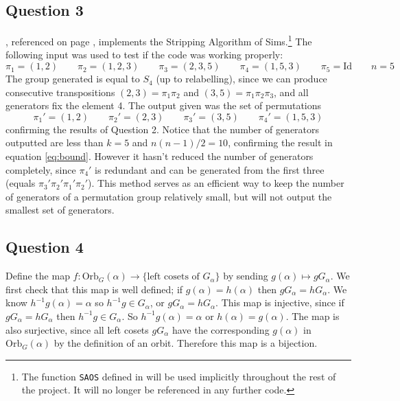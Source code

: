 \documentclass[10pt,a4paper,notitlepage]{article}
\newcommand{\Orb}{\text{Orb}}
\newcommand{\Id}{\text{Id}}
\begin{document}
\subsection*{\centering Question 3}
, referenced on page \pageref{cd:3}, implements the Stripping Algorithm of Sims.\footnote{The function \texttt{SAOS} defined in  will be used implicitly throughout the rest of the project. It will no longer be referenced in any further code.} The following input was used to test if the code was working properly:
\begin{equation*}
\pi_{1}=(1,2) \quad\quad \pi_{2}=(1,2,3) \quad\quad \pi_{3}=(2,3,5) \quad\quad \pi_{4}=(1,5,3) \quad\quad \pi_{5}=\Id \quad\quad n=5
\end{equation*}
The group generated is equal to $S_{4}$ (up to relabelling), since we can produce consecutive transpositions $(2,3)=\pi_{1}\pi_{2}$ and $(3,5)=\pi_{1}\pi_{2}\pi_{3}$, and all generators fix the element 4. The output given was the set of permutations 
\begin{equation*}
\pi_{1}'= (1,2) \quad\quad \pi_{2}'=(2,3) \quad\quad \pi_{3}'=(3,5) \quad\quad \pi_{4}'=(1,5,3)
\end{equation*}
confirming the results of Question 2. Notice that the number of generators outputted are less than $k=5$ and $n(n-1)/2=10$, confirming the result in equation \eqref{eq:bound}. However it hasn't reduced the number of generators completely, since $\pi_{4}'$ is redundant and can be generated from the first three (equals $\pi_{3}'\pi_{2}'\pi_{1}'\pi_{2}'$). This method serves as an efficient way to keep the number of generators of a permutation group relatively small, but will not output the smallest set of generators.\\

\subsection*{\centering Question 4}
Define the map $f: \Orb_{G}(\alpha) \rightarrow \lbrace \text{left cosets of } G_{\alpha}\rbrace$ by sending $g(\alpha) \mapsto gG_{\alpha}$. We first check that this map is well defined; if $g\left(\alpha\right)=h\left(\alpha\right)$ then $gG_{\alpha}=hG_{\alpha}$. We know $h^{-1}g(\alpha)=\alpha$ so $h^{-1}g\in G_{\alpha}$, or $gG_{\alpha}=hG_{\alpha}$. This map is injective, since if $gG_{\alpha}=hG_{\alpha}$ then $h^{-1}g\in G_{\alpha}$. So $h^{-1}g(\alpha)=\alpha$ or $h(\alpha)=g(\alpha)$. The map is also surjective, since all left cosets $gG_{\alpha}$ have the corresponding $g(\alpha)$ in $\Orb_{G}\left(\alpha\right)$ by the definition of an orbit. Therefore this map is a bijection. \\
\end{document}
